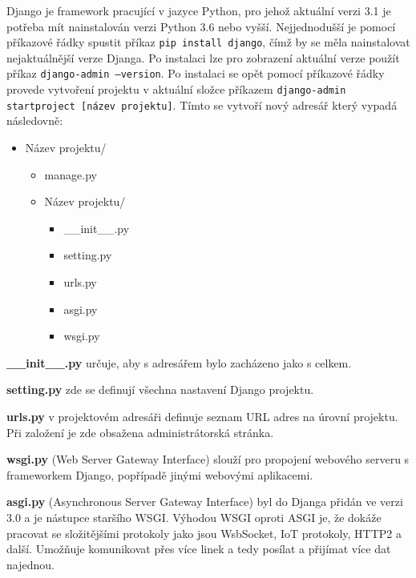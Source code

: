 Django je framework pracující v jazyce Python, pro jehož aktuální
verzi 3.1 je potřeba mít nainstalován verzi Python 3.6 nebo
vyšší. Nejjednodušší je pomocí příkazové řádky spustit příkaz {\tt pip
install django}, čímž by se měla nainstalovat nejaktuálnější verze
Djanga. Po instalaci lze pro zobrazení aktuální verze použít příkaz
{\tt django-admin --version}. Po instalaci se opět pomocí příkazové řádky
provede vytvoření projektu v aktuální složce příkazem {\tt django-admin
startproject [název projektu]}. \cite{django-init} Tímto se vytvoří nový adresář který
vypadá následovně:

\begin{itemize}
	\item \lbrack Název projektu\rbrack /
	\begin{itemize}
		\item manage.py
		\item \lbrack Název projektu\rbrack /
		\begin{itemize}
			\item \_\_init\_\_.py
			\item setting.py
			\item urls.py
			\item asgi.py
			\item wsgi.py
		\end{itemize}
	\end{itemize}
\end{itemize}

\vspace{6px}

\textbf{\_\_init\_\_.py} určuje, aby s adresářem bylo zacházeno jako s celkem.
\vspace{6px}

\textbf{setting.py} zde se definují všechna nastavení Django projektu. 
\vspace{6px}

\textbf{urls.py} v projektovém adresáři definuje seznam URL adres na
úrovní projektu. Při založení je zde obsažena administrátorská
stránka.  \vspace{6px}

\textbf{wsgi.py} (Web Server Gateway Interface) slouží pro propojení
webového serveru s frameworkem Django, popřípadě jinými webovými
aplikacemi.  \vspace{6px}

\textbf{asgi.py} (Asynchronous Server Gateway Interface) byl do Djanga
přidán ve verzi 3.0 a je nástupce staršího WSGI. Výhodou WSGI oproti
ASGI je, že dokáže pracovat se složitějšími protokoly jako jsou
WsbSocket, IoT protokoly, HTTP2 a další. Umožňuje komunikovat přes
více linek a tedy posílat a přijímat více dat najednou.  \vspace{6px}

